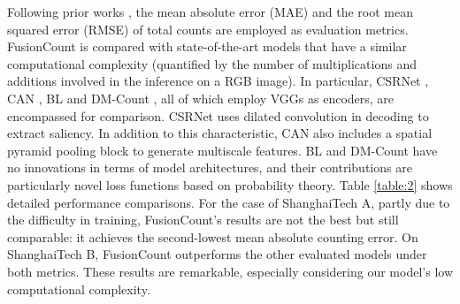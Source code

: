 \documentclass{article}
\begin{document}
Following prior works \cite{CSRNet, CAN, DMCount}, the mean absolute error (MAE) and the root mean squared error (RMSE) of total counts are employed as evaluation metrics.
FusionCount is compared with state-of-the-art models that have a similar computational complexity (quantified by the number of multiplications and additions involved in the inference on a  RGB image). In particular, CSRNet \cite{CSRNet}, CAN \cite{CAN}, BL \cite{BayesianLoss} and DM-Count \cite{DMCount}, all of which employ VGGs \cite{VGG} as encoders, are encompassed for comparison. CSRNet uses dilated convolution in decoding to extract saliency. In addition to this characteristic, CAN also includes a spatial pyramid pooling block to generate multiscale features. BL and DM-Count have no innovations in terms of model architectures, and their contributions are particularly novel loss functions based on probability theory. Table \ref{table:2} shows detailed performance comparisons. For the case of ShanghaiTech A, partly due to the difficulty in training, FusionCount's results are not the best but still comparable: it achieves the second-lowest mean absolute counting error. On ShanghaiTech B, FusionCount outperforms the other evaluated models under both metrics. These results are remarkable, especially considering our model's low computational complexity.
\end{document}
